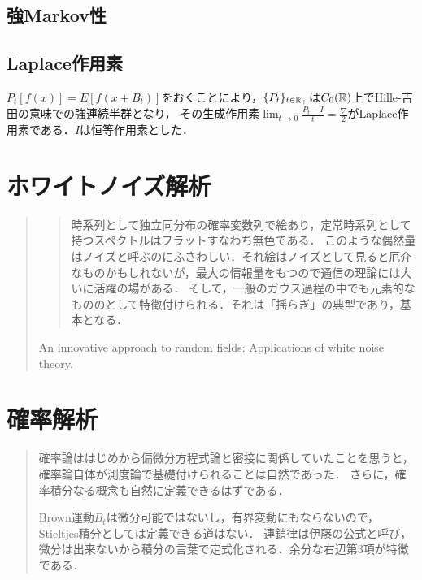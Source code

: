 \documentclass[uplatex,dvipdfmx]{jsreport}
\begin{document}
\section{強Markov性}

\section{Laplace作用素}

\begin{tcolorbox}[colframe=ForestGreen, colback=ForestGreen!10!white,breakable,colbacktitle=ForestGreen!40!white,coltitle=black,fonttitle=\bfseries\sffamily,
title=]
    $P_t[f(x)]=E[f(x+B_t)]$をおくことにより，$\{P_t\}_{t\in\mathbb{R}_+}$は$C_0(\mathbb{R})$上でHille-吉田の意味での強連続半群となり，
    その生成作用素$\lim_{t\to0}\frac{P_t-I}{t}=\frac{\nabla}{2}$がLaplace作用素である．$I$は恒等作用素とした．
\end{tcolorbox}

\chapter{ホワイトノイズ解析}

\begin{quotation}
    \begin{quote}
        時系列として独立同分布の確率変数列で絵あり，定常時系列として持つスペクトルはフラットすなわち無色である．
        このような偶然量はノイズと呼ぶのにふさわしい．それ絵はノイズとして見ると厄介なものかもしれないが，最大の情報量をもつので通信の理論には大いに活躍の場がある．
        そして，一般のガウス過程の中でも元素的なもののとして特徴付けられる．それは「揺らぎ」の典型であり，基本となる．
    \end{quote}
    An innovative approach to random fields: Applications of white noise theory.
\end{quotation}

\chapter{確率解析}

\begin{quotation}
    確率論ははじめから偏微分方程式論と密接に関係していたことを思うと，確率論自体が測度論で基礎付けられることは自然であった．
    さらに，確率積分なる概念も自然に定義できるはずである．

    Brown運動$B_t$は微分可能ではないし，有界変動にもならないので，Stieltjes積分としては定義できる道はない．
    連鎖律は伊藤の公式と呼び，微分は出来ないから積分の言葉で定式化される．余分な右辺第3項が特徴である．
\end{quotation}
\end{document}
